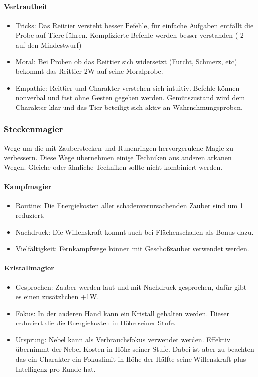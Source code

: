 \documentclass{article}
\begin{document}
\paragraph{Vertrautheit}

\begin{itemize}
\item Tricks: Das Reittier versteht besser Befehle, für einfache Aufgaben entfällt die Probe auf Tiere führen. Komplizierte Befehle werden besser verstanden (-2 auf den Mindestwurf)
\item Moral: Bei Proben ob das Reittier sich widersetzt (Furcht, Schmerz, etc) bekommt das Reittier 2W auf seine Moralprobe.
\item Empathie: Reittier und Charakter verstehen sich intuitiv. Befehle können nonverbal und fast ohne Gesten gegeben werden. Gemütszustand wird dem Charakter klar und das Tier beteiligt sich aktiv an Wahrnehmungsproben.
\end{itemize}

\subsubsection{Steckenmagier}

Wege um die mit Zauberstecken und Runenringen hervorgerufene Magie zu verbessern. Diese Wege übernehmen einige
Techniken aus anderen arkanen Wegen. Gleiche oder ähnliche Techniken sollte nicht kombiniert werden.

\paragraph{Kampfmagier}

\begin{itemize}
\item Routine: Die Energiekosten aller schadenverursachenden Zauber sind um 1 reduziert.
\item Nachdruck: Die Willenskraft kommt auch bei Flächenschaden als Bonus dazu.
\item Vielfältigkeit: Fernkampfwege können mit Geschoßzauber verwendet werden.
\end{itemize}

\paragraph{Kristallmagier}

\begin{itemize}
\item Gesprochen: Zauber werden laut und mit Nachdruck gesprochen, dafür gibt es einen zusätzlichen +1W.
\item Fokus: In der anderen Hand kann ein Kristall gehalten werden. Dieser reduziert die die Energiekosten in Höhe seiner Stufe.
\item Ursprung: Nebel kann als Verbrauchsfokus verwendet werden. Effektiv übernimmt der Nebel Kosten in Höhe seiner Stufe. Dabei ist aber zu beachten das ein Charakter ein Fokuslimit in Höhe der Hälfte seine Willenskraft plus Intelligenz pro Runde hat.
\end{itemize}
\end{document}

